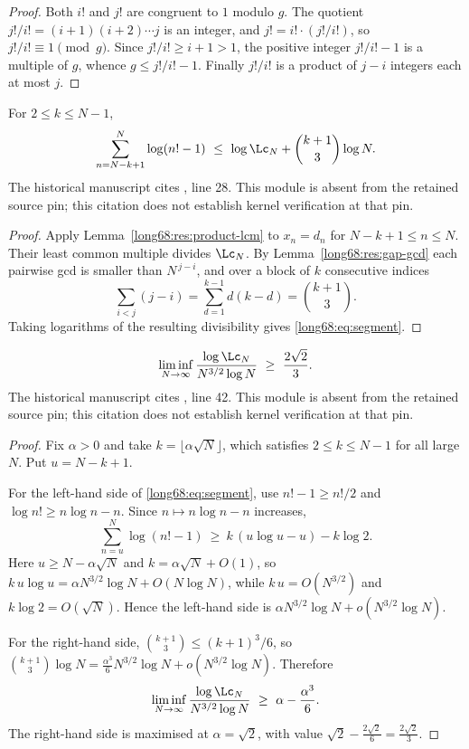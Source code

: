 \begin{proof}
Both $i!$ and $j!$ are congruent to $1$ modulo $g$.  The quotient
$j!/i!=(i+1)(i+2)\cdots j$ is an integer, and $j!=i!\cdot(j!/i!)$, so
$j!/i!\equiv1\pmod g$.  Since $j!/i!\ge i+1>1$, the positive integer
$j!/i!-1$ is a multiple of $g$, whence $g\le j!/i!-1$.  Finally
$j!/i!$ is a product of $j-i$ integers each at most $j$.
\end{proof}

\begin{lemma}\label{long68:res:segment}
For $2\le k\le N-1$,
\begin{equation}\label{long68:eq:segment}
 \sum_{n=N-k+1}^{N}\log(n!-1)
 \ \le\ \log \Lc_N+\binom{k+1}{3}\log N.
\end{equation}
  The historical manuscript cites , line 28. This module is absent from the retained source pin; this citation does not establish kernel verification at that pin.

\end{lemma}

\begin{proof}
Apply Lemma~\ref{long68:res:product-lcm} to $x_n=d_n$ for $N-k+1\le n\le N$.  Their
least common multiple divides $\Lc_N$.  By Lemma~\ref{long68:res:gap-gcd} each
pairwise gcd is smaller than $N^{\,j-i}$, and over a block of $k$ consecutive
indices
\[
 \sum_{i<j}(j-i)=\sum_{d=1}^{k-1}d(k-d)=\binom{k+1}{3}.
\]
Taking logarithms of the resulting divisibility gives \eqref{long68:eq:segment}.
\end{proof}

\begin{theorem}\label{long68:res:lcm-growth}
\[
 \liminf_{N\to\infty}\frac{\log \Lc_N}{N^{3/2}\log N}
 \ \ge\ \frac{2\sqrt2}{3}.
\]
  The historical manuscript cites , line 42. This module is absent from the retained source pin; this citation does not establish kernel verification at that pin.
\end{theorem}

\begin{proof}
Fix $\alpha>0$ and take $k=\lfloor\alpha\sqrt N\rfloor$, which satisfies
$2\le k\le N-1$ for all large $N$.  Put $u=N-k+1$.

For the left-hand side of \eqref{long68:eq:segment}, use $n!-1\ge n!/2$ and
$\log n!\ge n\log n-n$.  Since $n\mapsto n\log n-n$ increases,
\[
 \sum_{n=u}^{N}\log(n!-1)\ \ge\ k\,(u\log u-u)-k\log2 .
\]
Here $u\ge N-\alpha\sqrt N$ and $k=\alpha\sqrt N+O(1)$, so
$k\,u\log u=\alpha N^{3/2}\log N+O(N\log N)$, while $k\,u=O(N^{3/2})$ and
$k\log2=O(\sqrt N)$.  Hence the left-hand side is
$\alpha N^{3/2}\log N+o(N^{3/2}\log N)$.

For the right-hand side, $\binom{k+1}{3}\le(k+1)^3/6$, so
$\binom{k+1}{3}\log N=\tfrac{\alpha^3}{6}N^{3/2}\log N+o(N^{3/2}\log N)$.
Therefore
\[
 \liminf_{N\to\infty}\frac{\log \Lc_N}{N^{3/2}\log N}
 \ \ge\ \alpha-\frac{\alpha^3}{6}.
\]
The right-hand side is maximised at $\alpha=\sqrt2$, with value
$\sqrt2-\tfrac{2\sqrt2}{6}=\tfrac{2\sqrt2}{3}$.
\end{proof}

